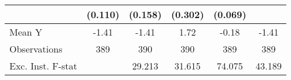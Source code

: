 {\begin{tabular}{l*{5}{c}}
            &     (0.110)         &     (0.158)         &     (0.302)         &     (0.069)         &                     \\
\midrule
Mean Y      &       -1.41         &       -1.41         &        1.72         &       -0.18         &       -1.41         \\
Observations&         389         &         390         &         390         &         389         &         389         \\
Exc. Inst. F-stat&                     &      29.213         &      31.615         &      74.075         &      43.189         \\
\bottomrule
\end{tabular}
}
